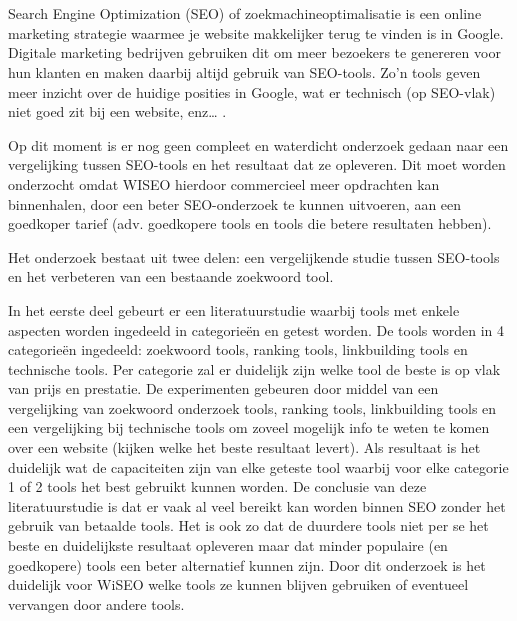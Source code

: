 

\chapter*{}

Search Engine Optimization (SEO) of zoekmachineoptimalisatie is een online marketing strategie waarmee je website makkelijker terug te vinden is in Google. Digitale marketing bedrijven gebruiken dit om meer bezoekers te genereren voor hun klanten en maken daarbij altijd gebruik van SEO-tools. Zo’n tools geven meer inzicht over de huidige posities in Google, wat er technisch (op SEO-vlak) niet goed zit bij een website, enz… .

Op dit moment is er nog geen compleet en waterdicht onderzoek gedaan naar een vergelijking tussen SEO-tools en het resultaat dat ze opleveren. Dit moet worden onderzocht omdat WISEO hierdoor commercieel meer opdrachten kan binnenhalen, door een beter SEO-onderzoek te kunnen uitvoeren, aan een goedkoper tarief (adv. goedkopere tools en tools die betere resultaten hebben). 

Het onderzoek bestaat uit twee delen: een vergelijkende studie tussen SEO-tools en het verbeteren van een bestaande zoekwoord tool.

In het eerste deel gebeurt er een literatuurstudie waarbij tools met enkele aspecten worden ingedeeld in categorieën en getest worden. De tools worden in 4 categorieën ingedeeld: zoekwoord tools, ranking tools, linkbuilding tools en technische tools. Per categorie zal er duidelijk zijn welke tool de beste is op vlak van prijs en prestatie. De experimenten gebeuren door middel van een vergelijking van zoekwoord onderzoek tools, ranking tools, linkbuilding tools en een vergelijking bij technische tools om zoveel mogelijk info te weten te komen over een website (kijken welke het beste resultaat levert). Als resultaat is het duidelijk wat de capaciteiten zijn van elke geteste tool waarbij voor elke categorie 1 of 2 tools het best gebruikt kunnen worden. De conclusie van deze literatuurstudie is dat er vaak al veel bereikt kan worden binnen SEO zonder het gebruik van betaalde tools. Het is ook zo dat de duurdere tools niet per se het beste en duidelijkste resultaat opleveren maar dat minder populaire (en goedkopere) tools een beter alternatief kunnen zijn. Door dit onderzoek is het duidelijk voor WiSEO welke tools ze kunnen blijven gebruiken of eventueel vervangen door andere tools. 

